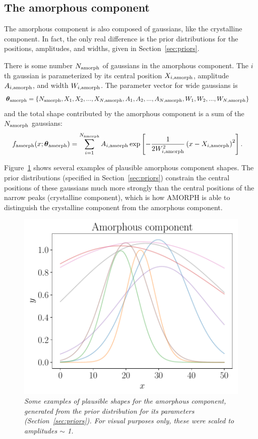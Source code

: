 \documentclass[preprint, a4paper]{elsarticle}
\newcommand{\params}{\boldsymbol{\theta}}
\newcommand{\x}{x}
\begin{document}
\subsection{The amorphous component}
The amorphous component is also composed of gaussians, like the crystalline component.
In fact, the only real difference is the prior distributions for the positions,
amplitudes, and widths, given in Section~\ref{sec:priors}.

There is some number $N_{\rm amorph}$ of gaussians in the amorphous component.
The $i$th gaussian is parameterized
by its central position $X_{i, \rm amorph}$,
amplitude $A_{i, \rm amorph}$, and width $W_{i, \rm amorph}$.
The parameter vector for wide gaussians is
\begin{align}
\params_{\rm amorph} &=
  \{N_{\rm amorph}, X_1, X_2, ..., X_{N, \rm amorph},
    A_1, A_2, ..., A_{N, \rm amorph},
    W_1, W_2, ..., W_{N, \rm amorph}\}
\end{align}
and the total shape contributed by the
amorphous component is a sum of the $N_{\rm amorph}$ gaussians:
\begin{align}
f_{\rm amorph}(\x; \params_{\rm amorph}) &=
    \sum_{i=1}^{N_{\rm amorph}} A_{i, \rm amorph}
 \exp\left[-\frac{1}{2W_{i, \rm amorph}^2}\left(x - X_{i, \rm amorph}\right)^2\right].
\end{align}

Figure~\ref{fig:wide_component} shows several examples of plausible amorphous component shapes. The prior distributions (specified in
Section~\ref{sec:priors})
constrain the central positions of these gaussians much
more strongly than the central positions of the narrow peaks (crystalline component), which is how AMORPH is able to distinguish the crystalline
component from the amorphous component.

\begin{figure}[!ht]
\centering
\includegraphics[scale=0.7]{figures/wide_component.pdf}
\caption{\it Some examples of plausible shapes for the amorphous component,
generated from the prior distribution for its parameters
(Section~\ref{sec:priors}). For visual purposes only, these
were scaled to amplitudes $\sim$ 1. \label{fig:wide_component}}
\end{figure}
\end{document}
